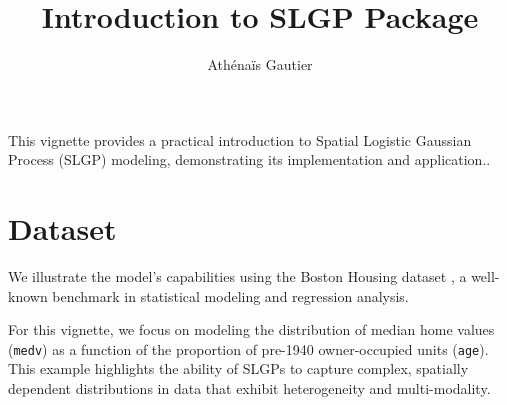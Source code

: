 \documentclass[
]{article}
\title{Introduction to SLGP Package}
\author{Athénaïs Gautier}
\date{}
\begin{document}
\maketitle

This vignette provides a practical introduction to Spatial Logistic Gaussian Process (SLGP) modeling, demonstrating its implementation and application..

\section{Dataset}\label{dataset}

We illustrate the model's capabilities using the Boston Housing dataset \citet{harrison_hedonic_1978}, a well-known benchmark in statistical modeling and regression analysis.

For this vignette, we focus on modeling the distribution of median home values (\texttt{medv}) as a function of the proportion of pre-1940 owner-occupied units (\texttt{age}). This example highlights the ability of SLGPs to capture complex, spatially dependent distributions in data that exhibit heterogeneity and multi-modality.
\end{document}
